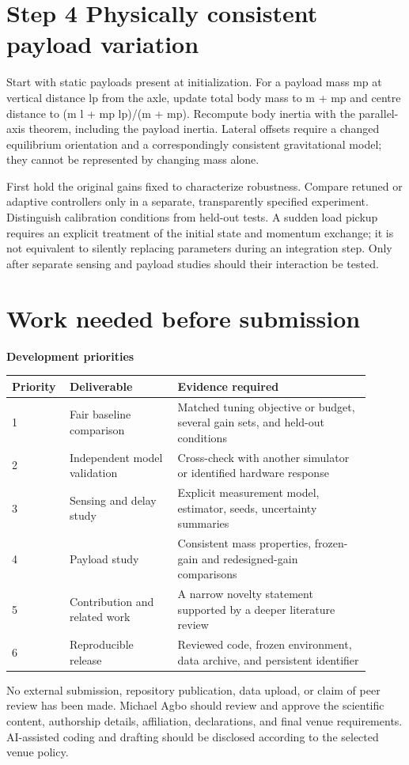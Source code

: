 \documentclass[11pt,a4paper]{article}
\begin{document}
\section*{Step 4 Physically consistent payload variation}
Start with static payloads present at initialization. For a payload mass mp at vertical distance lp from the axle, update total body mass to m + mp and centre distance to (m l + mp lp)/(m + mp). Recompute body inertia with the parallel-axis theorem, including the payload inertia. Lateral offsets require a changed equilibrium orientation and a correspondingly consistent gravitational model; they cannot be represented by changing mass alone.

First hold the original gains fixed to characterize robustness. Compare retuned or adaptive controllers only in a separate, transparently specified experiment. Distinguish calibration conditions from held-out tests. A sudden load pickup requires an explicit treatment of the initial state and momentum exchange; it is not equivalent to silently replacing parameters during an integration step. Only after separate sensing and payload studies should their interaction be tested.

\section*{Work needed before submission}
\textbf{Development priorities}
\begin{longtable}{p{0.108\linewidth}p{0.288\linewidth}p{0.504\linewidth}}
\toprule
Priority & Deliverable & Evidence required \\ \midrule \endhead
1 & Fair baseline comparison & Matched tuning objective or budget, several gain sets, and held-out conditions \\
2 & Independent model validation & Cross-check with another simulator or identified hardware response \\
3 & Sensing and delay study & Explicit measurement model, estimator, seeds, uncertainty summaries \\
4 & Payload study & Consistent mass properties, frozen-gain and redesigned-gain comparisons \\
5 & Contribution and related work & A narrow novelty statement supported by a deeper literature review \\
6 & Reproducible release & Reviewed code, frozen environment, data archive, and persistent identifier \\
\bottomrule
\end{longtable}
No external submission, repository publication, data upload, or claim of peer review has been made. Michael Agbo should review and approve the scientific content, authorship details, affiliation, declarations, and final venue requirements. AI-assisted coding and drafting should be disclosed according to the selected venue policy.
\end{document}
